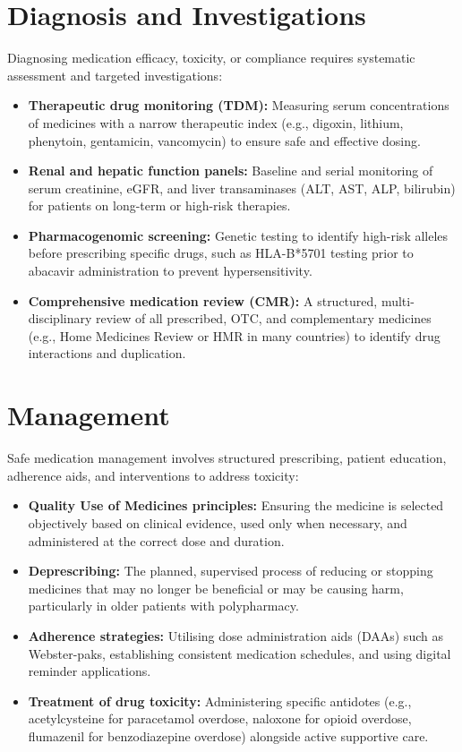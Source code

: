 \section*{Diagnosis and Investigations}
Diagnosing medication efficacy, toxicity, or compliance requires systematic assessment and targeted investigations:
\begin{itemize}
    \item \textbf{Therapeutic drug monitoring (TDM):} Measuring serum concentrations of medicines with a narrow therapeutic index (e.g., digoxin, lithium, phenytoin, gentamicin, vancomycin) to ensure safe and effective dosing.
    \item \textbf{Renal and hepatic function panels:} Baseline and serial monitoring of serum creatinine, eGFR, and liver transaminases (ALT, AST, ALP, bilirubin) for patients on long-term or high-risk therapies.
    \item \textbf{Pharmacogenomic screening:} Genetic testing to identify high-risk alleles before prescribing specific drugs, such as HLA-B*5701 testing prior to abacavir administration to prevent hypersensitivity.
    \item \textbf{Comprehensive medication review (CMR):} A structured, multi-disciplinary review of all prescribed, OTC, and complementary medicines (e.g., Home Medicines Review or HMR in many countries) to identify drug interactions and duplication.
\end{itemize}

\section*{Management}
Safe medication management involves structured prescribing, patient education, adherence aids, and interventions to address toxicity:
\begin{itemize}
    \item \textbf{Quality Use of Medicines principles:} Ensuring the medicine is selected objectively based on clinical evidence, used only when necessary, and administered at the correct dose and duration.
    \item \textbf{Deprescribing:} The planned, supervised process of reducing or stopping medicines that may no longer be beneficial or may be causing harm, particularly in older patients with polypharmacy.
    \item \textbf{Adherence strategies:} Utilising dose administration aids (DAAs) such as Webster-paks, establishing consistent medication schedules, and using digital reminder applications.
    \item \textbf{Treatment of drug toxicity:} Administering specific antidotes (e.g., acetylcysteine for paracetamol overdose, naloxone for opioid overdose, flumazenil for benzodiazepine overdose) alongside active supportive care.
\end{itemize}


